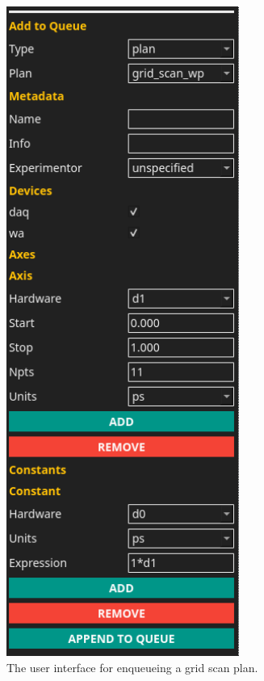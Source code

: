 \documentclass[11pt, full]{article}
\begin{document}
\clearpage

\begin{figure}
\includegraphics[width=3in]{"figures/grid_scan.png"}
\caption{The user interface for enqueueing a grid scan plan.}
\label{acq:fig:grid_scan}
\end{figure}

\clearpage
\end{document}
